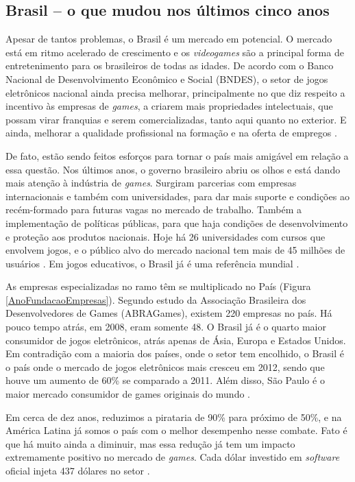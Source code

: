 \subsection{Brasil -- o que mudou nos últimos cinco anos}
%
Apesar de tantos problemas, o Brasil é um mercado em potencial. O mercado está em ritmo acelerado de crescimento e os \textit{videogames} são a principal forma de entretenimento para os brasileiros de todas as idades. De acordo com o Banco Nacional de Desenvolvimento Econômico e Social (BNDES), o setor de jogos eletrônicos nacional ainda precisa melhorar, principalmente no que diz respeito a incentivo às empresas de \textit{games}, a criarem mais propriedades intelectuais, que possam virar franquias e serem comercializadas, tanto aqui quanto no exterior. E ainda, melhorar a qualidade profissional na formação e na oferta de empregos \cite{GEDIGames}.
\par
De fato, estão sendo feitos esforços para tornar o país mais amigável em relação a essa questão. Nos últimos anos, o governo brasileiro abriu os olhos e está dando mais atenção à indústria de \textit{games}. Surgiram parcerias com empresas internacionais e também com universidades, para dar mais suporte e condições ao recém-formado para futuras vagas no mercado de trabalho. Também a implementação de políticas públicas, para que haja condições de desenvolvimento e proteção aos produtos nacionais. Hoje há 26 universidades com cursos que envolvem jogos, e o público alvo do mercado nacional tem mais de 45 milhões de usuários . Em jogos educativos, o Brasil já é uma referência mundial \cite{GEDIGames}.

As empresas especializadas no ramo têm se multiplicado no País (Figura \ref{AnoFundacaoEmpresas}). Segundo estudo da Associação Brasileira dos Desenvolvedores de Games (ABRAGames), existem 220 empresas no país. Há pouco tempo atrás, em 2008, eram somente 48. O Brasil já é o quarto maior consumidor de jogos eletrônicos, atrás apenas de Ásia, Europa e Estados Unidos. Em contradição com a maioria dos países, onde o setor tem encolhido, o Brasil é o país onde o mercado de jogos eletrônicos mais cresceu em 2012, sendo que houve um aumento de 60\% se comparado a 2011. Além disso, São Paulo é o maior mercado consumidor de games originais do mundo \cite{GEDIGames}.

Em cerca de dez anos, reduzimos a pirataria de 90\% para próximo de 50\%, e na América Latina já somos o país com o melhor desempenho nesse combate. Fato é que há muito ainda a diminuir, mas essa redução já tem um impacto extremamente positivo no mercado de \textit{games}. Cada dólar investido em \textit{software} oficial injeta 437 dólares no setor \cite{GEDIGames}.

